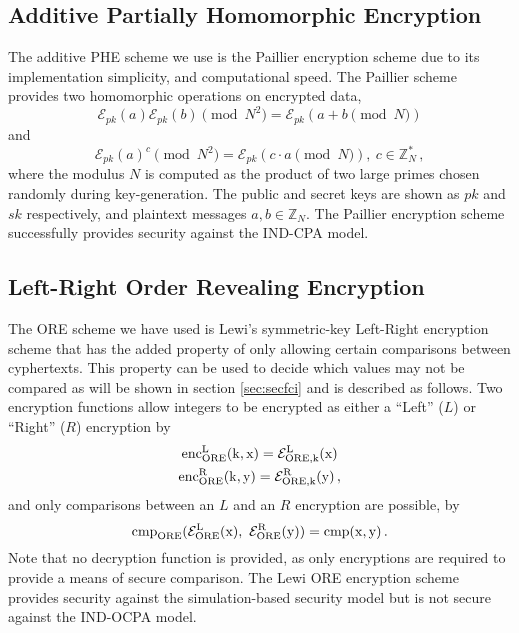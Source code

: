 \documentclass[letterpaper, 10 pt, conference]{ieeeconf}  %
\begin{document}
\subsection{Additive Partially Homomorphic Encryption} \label{subsec:paillier}
The additive PHE scheme we use is the Paillier encryption scheme \cite{paillierPublicKeyCryptosystemsBased1999} due to its implementation simplicity, and computational speed. The Paillier scheme provides two homomorphic operations on encrypted data, 
\begin{equation}
   \mathcal{E}_{pk}(a)\mathcal{E}_{pk}(b) \!\!\pmod{N^{2}} = \mathcal{E}_{pk}(a + b \!\!\pmod{N}) \label{eqn:paillier_add}
\end{equation}
and
\begin{equation}
   \mathcal{E}_{pk}(a)^c \!\!\pmod{N^{2}} = \mathcal{E}_{pk}(c\cdot a \!\!\pmod{N}),\ c \in \mathbb{Z}^*_N\,, \label{eqn:paillier_mult}
\end{equation}
where the modulus $N$ is computed as the product of two large primes chosen randomly during key-generation. The public and secret keys are shown as $pk$ and $sk$ respectively, and plaintext messages $a,b \in \mathbb{Z}_N$. The Paillier encryption scheme successfully provides security against the IND-CPA model.

\subsection{Left-Right Order Revealing Encryption} \label{subsec:lewi}
The ORE scheme we have used is Lewi's symmetric-key Left-Right encryption scheme \cite{lewiOrderRevealingEncryptionNew2016} that has the added property of only allowing certain comparisons between cyphertexts. This property can be used to decide which values may not be compared as will be shown in section \ref{sec:secfci} and is described as follows. Two encryption functions allow integers to be encrypted as either a ``Left'' ($L$) or ``Right'' ($R$) encryption by
\begin{equation}
   \begin{gathered} \label{eqn:lewi_l_r}
      \operatorfont{enc}^L_{ORE}(k, x) = \mathcal{E}^L_{ORE,k}(x) \\
      \operatorfont{enc}^R_{ORE}(k, y) = \mathcal{E}^R_{ORE,k}(y)\,,
   \end{gathered}
\end{equation}
and only comparisons between an $L$ and an $R$ encryption are possible, by
\begin{equation}
   \operatorfont{cmp}_{ORE}(\mathcal{E}^L_{ORE}(x),\ \mathcal{E}^R_{ORE}(y)) = \operatorfont{cmp}(x, y)\,. \label{eqn:lewi_cmp}
\end{equation}
Note that no decryption function is provided, as only encryptions are required to provide a means of secure comparison. The Lewi ORE encryption scheme provides security against the simulation-based security model \cite{chenettePracticalOrderRevealingEncryption2016} but is not secure against the IND-OCPA model.
\end{document}
